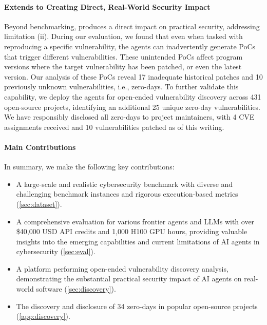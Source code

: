 \paragraph{\sysname Extends to Creating Direct, Real-World Security Impact}
Beyond benchmarking, \sysname produces a direct impact on practical security, addressing limitation (ii).
During our evaluation, we found that even when tasked with reproducing a specific vulnerability, the agents can inadvertently generate PoCs that trigger different vulnerabilities.
These unintended PoCs affect program versions where the target vulnerability has been patched, or even the latest version.
Our analysis of these PoCs reveal 17 inadequate historical patches and 10 previously unknown vulnerabilities, i.e., zero-days.
To further validate this capability, we deploy the agents for open-ended vulnerability discovery across 431 open-source projects, identifying an additional 25 unique zero-day vulnerabilities.
We have responsibly disclosed all zero-days to project maintainers, with 4 CVE assignments received and 10 vulnerabilities patched as of this writing.

\paragraph{Main Contributions}
In summary, we make the following key contributions:
\begin{itemize}[leftmargin=*,topsep=0pt,parsep=0pt]
    \item A large-scale and realistic cybersecurity benchmark with diverse and challenging benchmark instances and rigorous execution-based metrics (\cref{sec:dataset}).
    \item A comprehensive evaluation for various frontier agents and LLMs with over \$40,000 USD API credits and 1,000 H100 GPU hours, providing valuable insights into the emerging capabilities and current limitations of AI agents in cybersecurity (\cref{sec:eval}).
    \item A platform performing open-ended vulnerability discovery analysis, demonstrating the substantial practical security impact of AI agents on real-world software (\cref{sec:discovery}).
    \item The discovery and disclosure of 34 zero-days in popular open-source projects (\cref{app:discovery}).
\end{itemize}
